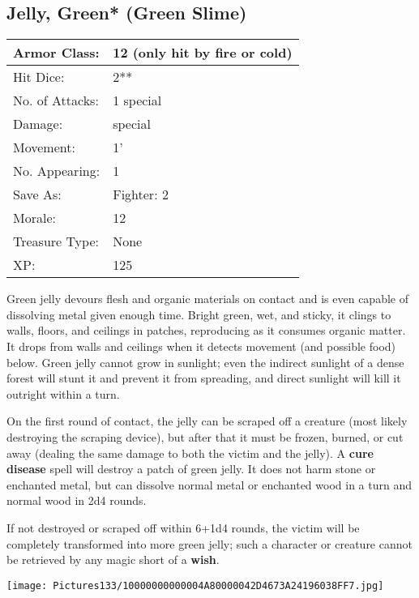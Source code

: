 \documentclass[a4paper,twoside,openany,10pt]{book}
\begin{document}
\begin{multicols}{2}
\subsection*{Jelly, Green* (Green Slime)}\label{jelly-green-green-slime}

\begin{tabularx}{0.50\textwidth}{@{}lX@{}}
Armor Class: & 12 (only hit by fire or cold) \\\hline
Hit Dice: & 2** \\\hline
No. of Attacks: & 1 special \\\hline
Damage: & special \\\hline
Movement: & 1' \\\hline
No. Appearing: & 1 \\\hline
Save As: & Fighter: 2 \\\hline
Morale: & 12 \\\hline
Treasure Type: & None \\\hline
XP: & 125 \\\hline
\end{tabularx}\medskip

Green jelly devours flesh and organic materials on contact and is even capable of dissolving metal given enough time. Bright green, wet, and sticky, it clings to walls, floors, and ceilings in patches, reproducing as it consumes organic matter. It drops from walls and ceilings when it detects movement (and possible food) below. Green jelly cannot grow in sunlight; even the indirect sunlight of a dense forest will stunt it and prevent it from spreading, and direct sunlight will kill it outright within a turn.

On the first round of contact, the jelly can be scraped off a creature (most likely destroying the scraping device), but after that it must be frozen, burned, or cut away (dealing the same damage to both the victim and the jelly). A \textbf{cure disease} spell will destroy a patch of green jelly. It does not harm stone or enchanted metal, but can dissolve normal metal or enchanted wood in a turn and normal wood in 2d4 rounds.

If not destroyed or scraped off within 6+1d4 rounds, the victim will be completely transformed into more green jelly; such a character or creature cannot be retrieved by any magic short of a \textbf{wish}.

\begin{center} \texttt{[image: Pictures133/10000000000004A80000042D4673A24196038FF7.jpg]} \end{center}



\end{multicols}
\end{document}
